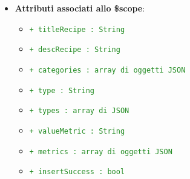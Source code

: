 \begin{itemize}
				\item \textbf{Attributi associati allo \$scope}:
					\begin{itemize}
						\item \textcolor{forestgreen}{\texttt{+ titleRecipe : String}}
						\item \textcolor{forestgreen}{\texttt{+ descRecipe : String}}
						\item \textcolor{forestgreen}{\texttt{+ categories : array di oggetti JSON}}
						\item \textcolor{forestgreen}{\texttt{+ type : String}}
						\item \textcolor{forestgreen}{\texttt{+ types : array di JSON}}
						\item \textcolor{forestgreen}{\texttt{+ valueMetric : String}}
						\item \textcolor{forestgreen}{\texttt{+ metrics : array di oggetti JSON}}
						\item \textcolor{forestgreen}{\texttt{+ insertSuccess : bool}}
							\begin{description}

\end{description}
\end{itemize}
\end{itemize}
